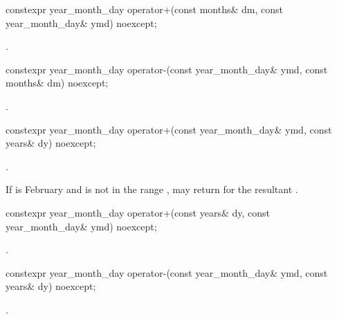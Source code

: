 %
\begin{itemdecl}
constexpr year_month_day operator+(const months& dm, const year_month_day& ymd) noexcept;
\end{itemdecl}

\begin{itemdescr}
\pnum
\returns {}.
\end{itemdescr}

%
\begin{itemdecl}
constexpr year_month_day operator-(const year_month_day& ymd, const months& dm) noexcept;
\end{itemdecl}

\begin{itemdescr}
\pnum
\returns {}.
\end{itemdescr}

%
\begin{itemdecl}
constexpr year_month_day operator+(const year_month_day& ymd, const years& dy) noexcept;
\end{itemdecl}

\begin{itemdescr}
\pnum
\returns {}.

\pnum
\begin{note}
If  is February
and  is not in the range ,
 may return  for
the resultant .
\end{note}
\end{itemdescr}

%
\begin{itemdecl}
constexpr year_month_day operator+(const years& dy, const year_month_day& ymd) noexcept;
\end{itemdecl}

\begin{itemdescr}
\pnum
\returns {}.
\end{itemdescr}

%
\begin{itemdecl}
constexpr year_month_day operator-(const year_month_day& ymd, const years& dy) noexcept;
\end{itemdecl}

\begin{itemdescr}
\pnum
\returns {}.
\end{itemdescr}

